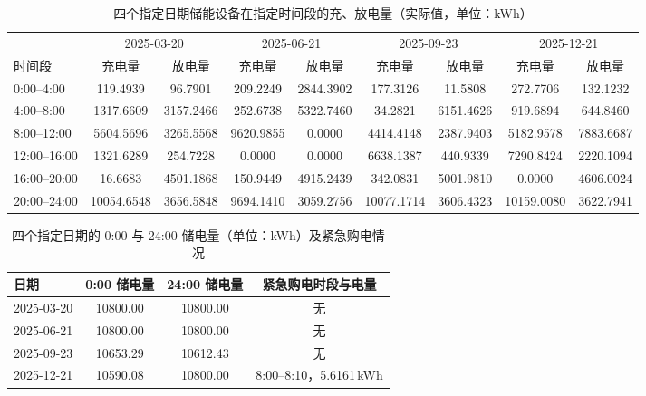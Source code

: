 \begin{table}[!htbp]
\caption{四个指定日期储能设备在指定时间段的充、放电量（实际值，单位：kWh）}\label{tab:q2-chdis}
\centering
\small
\setlength{\tabcolsep}{3.5pt}
\begin{tabular}{lcccccccc}
\toprule
 & \multicolumn{2}{c}{2025-03-20} & \multicolumn{2}{c}{2025-06-21} & \multicolumn{2}{c}{2025-09-23} & \multicolumn{2}{c}{2025-12-21} \\
\cmidrule(lr){2-3}\cmidrule(lr){4-5}\cmidrule(lr){6-7}\cmidrule(lr){8-9}
时间段 & 充电量 & 放电量 & 充电量 & 放电量 & 充电量 & 放电量 & 充电量 & 放电量 \\
\midrule
0:00--4:00   & 119.4939   & 96.7901   & 209.2249  & 2844.3902 & 177.3126   & 11.5808   & 272.7706   & 132.1232 \\
4:00--8:00   & 1317.6609  & 3157.2466 & 252.6738  & 5322.7460 & 34.2821    & 6151.4626 & 919.6894   & 644.8460 \\
8:00--12:00  & 5604.5696  & 3265.5568 & 9620.9855 & 0.0000    & 4414.4148  & 2387.9403 & 5182.9578  & 7883.6687 \\
12:00--16:00 & 1321.6289  & 254.7228  & 0.0000    & 0.0000    & 6638.1387  & 440.9339  & 7290.8424  & 2220.1094 \\
16:00--20:00 & 16.6683    & 4501.1868 & 150.9449  & 4915.2439 & 342.0831   & 5001.9810 & 0.0000     & 4606.0024 \\
20:00--24:00 & 10054.6548 & 3656.5848 & 9694.1410 & 3059.2756 & 10077.1714 & 3606.4323 & 10159.0080 & 3622.7941 \\
\bottomrule
\end{tabular}
\end{table}

\begin{table}[!htbp]
\caption{四个指定日期的 0:00 与 24:00 储电量（单位：kWh）及紧急购电情况}\label{tab:q2-emerg}
\centering
\small
\begin{tabular}{lccc}
\toprule
日期 & 0:00 储电量 & 24:00 储电量 & 紧急购电时段与电量 \\
\midrule
2025-03-20 & 10800.00 & 10800.00 & 无 \\
2025-06-21 & 10800.00 & 10800.00 & 无 \\
2025-09-23 & 10653.29 & 10612.43 & 无 \\
2025-12-21 & 10590.08 & 10800.00 & 8:00--8:10，5.6161\,kWh \\
\bottomrule
\end{tabular}
\end{table}

